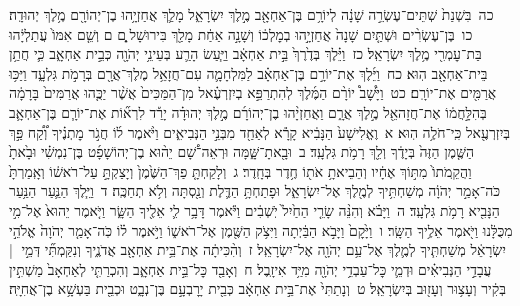 \documentclass[18pt]{article}
\begin{document}
 {\loc כה~}בִּשְׁנַת֙ שְׁתֵּים־עֶשְׂרֵ֣ה שָׁנָ֔ה לְיוֹרָ֥ם בֶּן־אַחְאָ֖ב מֶ֣לֶךְ יִשְׂרָאֵ֑ל מָלַ֛ךְ אֲחַזְיָ֥הוּ בֶן־יְהוֹרָ֖ם מֶ֥לֶךְ יְהוּדָֽה׃ \startlock
 {\loc כו~}בֶּן־עֶשְׂרִ֨ים וּשְׁתַּ֤יִם שָׁנָה֙ אֲחַזְיָ֣הוּ בְמׇלְכ֔וֹ וְשָׁנָ֣ה אַחַ֔ת מָלַ֖ךְ בִּירוּשָׁל ָ֑͏ְם ם וְשֵׁ֤ם אִמּוֹ֙ עֲתַלְיָ֔הוּ בַּת־עׇמְרִ֖י מֶ֥לֶךְ יִשְׂרָאֵֽל׃ \startlock
 {\loc כז~}וַיֵּ֗לֶךְ בְּדֶ֙רֶךְ֙ בֵּ֣ית אַחְאָ֔ב וַיַּ֧עַשׂ הָרַ֛ע בְּעֵינֵ֥י יְהֹוָ֖ה כְּבֵ֣ית אַחְאָ֑ב כִּ֛י חֲתַ֥ן בֵּית־אַחְאָ֖ב הֽוּא׃ \startlock
 {\loc כח~}וַיֵּ֜לֶךְ אֶת־יוֹרָ֣ם בֶּן־אַחְאָ֗ב לַמִּלְחָמָ֛ה עִם־חֲזָאֵ֥ל מֶלֶךְ־אֲרָ֖ם בְּרָמֹ֣ת גִּלְעָ֑ד וַיַּכּ֥וּ אֲרַמִּ֖ים אֶת־יוֹרָֽם׃ \startlock
 {\loc כט~}וַיָּ֩שׇׁב֩ יוֹרָ֨ם הַמֶּ֜לֶךְ לְהִתְרַפֵּ֣א בְיִזְרְעֶ֗אל מִן־הַמַּכִּים֙ אֲשֶׁ֨ר יַכֻּ֤הוּ אֲרַמִּים֙ בָּרָמָ֔ה בְּהִלָּ֣חֲמ֔וֹ אֶת־חֲזָהאֵ֖ל מֶ֣לֶךְ אֲרָ֑ם וַאֲחַזְיָ֨הוּ בֶן־יְהוֹרָ֜ם מֶ֣לֶךְ יְהוּדָ֗ה יָרַ֡ד לִרְא֞וֹת אֶת־יוֹרָ֧ם בֶּן־אַחְאָ֛ב בְּיִזְרְעֶ֖אל כִּֽי־חֹלֶ֥ה הֽוּא׃ 
\startlock
 {\loc א~}וֶאֱלִישָׁע֙ הַנָּבִ֔יא קָרָ֕א לְאַחַ֖ד מִבְּנֵ֣י הַנְּבִיאִ֑ים וַיֹּ֨אמֶר ל֜וֹ חֲגֹ֣ר מׇתְנֶ֗יךָ וְ֠קַ֠ח פַּ֣ךְ הַשֶּׁ֤מֶן הַזֶּה֙ בְּיָדֶ֔ךָ וְלֵ֖ךְ רָמֹ֥ת גִּלְעָֽד׃ \startlock
 {\loc ב~}וּבָ֖אתָ־שָּׁ֑מָּה וּרְאֵה־שָׁ֠ם יֵה֨וּא בֶן־יְהוֹשָׁפָ֜ט בֶּן־נִמְשִׁ֗י וּבָ֙אתָ֙ וַהֲקֵֽמֹתוֹ֙ מִתּ֣וֹךְ אֶחָ֔יו וְהֵבֵיאתָ֥ אֹת֖וֹ חֶ֥דֶר בְּחָֽדֶר׃ \startlock
 {\loc ג~}וְלָקַחְתָּ֤ פַךְ־הַשֶּׁ֙מֶן֙ וְיָצַקְתָּ֣ עַל־רֹאשׁ֔וֹ וְאָֽמַרְתָּ֙ כֹּה־אָמַ֣ר יְהֹוָ֔ה מְשַׁחְתִּ֥יךָ לְמֶ֖לֶךְ אֶל־יִשְׂרָאֵ֑ל וּפָתַחְתָּ֥ הַדֶּ֛לֶת וְנַ֖סְתָּה וְלֹ֥א תְחַכֶּֽה׃ \startlock
 {\loc ד~}וַיֵּ֧לֶךְ הַנַּ֛עַר הַנַּ֥עַר הַנָּבִ֖יא רָמֹ֥ת גִּלְעָֽד׃ \startlock
 {\loc ה~}וַיָּבֹ֗א וְהִנֵּ֨ה שָׂרֵ֤י הַחַ֙יִל֙ יֹֽשְׁבִ֔ים וַיֹּ֕אמֶר דָּבָ֥ר לִ֛י אֵלֶ֖יךָ הַשָּׂ֑ר וַיֹּ֤אמֶר יֵהוּא֙ אֶל־מִ֣י מִכֻּלָּ֔נוּ וַיֹּ֖אמֶר אֵלֶ֥יךָ הַשָּֽׂר׃ \startlock
 {\loc ו~}וַיָּ֙קׇם֙ וַיָּבֹ֣א הַבַּ֔יְתָה וַיִּצֹ֥ק הַשֶּׁ֖מֶן אֶל־רֹאשׁ֑וֹ וַיֹּ֣אמֶר ל֗וֹ כֹּֽה־אָמַ֤ר יְהֹוָה֙ אֱלֹהֵ֣י יִשְׂרָאֵ֔ל מְשַׁחְתִּ֧יךָ לְמֶ֛לֶךְ אֶל־עַ֥ם יְהֹוָ֖ה אֶל־יִשְׂרָאֵֽל׃ \startlock
 {\loc ז~}וְהִ֨כִּיתָ֔ה אֶת־בֵּ֥ית אַחְאָ֖ב אֲדֹנֶ֑יךָ וְנִקַּמְתִּ֞י דְּמֵ֣י  |  עֲבָדַ֣י הַנְּבִיאִ֗ים וּדְמֵ֛י כׇּל־עַבְדֵ֥י יְהֹוָ֖ה מִיַּ֥ד אִיזָֽבֶל׃ \startlock
 {\loc ח~}וְאָבַ֖ד כׇּל־בֵּ֣ית אַחְאָ֑ב וְהִכְרַתִּ֤י לְאַחְאָב֙ מַשְׁתִּ֣ין בְּקִ֔יר וְעָצ֥וּר וְעָז֖וּב בְּיִשְׂרָאֵֽל׃ \startlock
 {\loc ט~}וְנָתַתִּי֙ אֶת־בֵּ֣ית אַחְאָ֔ב כְּבֵ֖ית יָרׇבְעָ֣ם בֶּן־נְבָ֑ט וּכְבֵ֖ית בַּעְשָׁ֥א בֶן־אֲחִיָּֽה׃ \startlock
\end{document}
